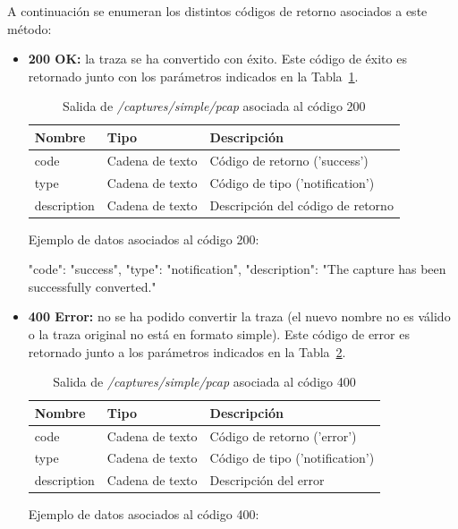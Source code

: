 A continuación se enumeran los distintos códigos de retorno asociados a este método:
\begin{itemize}

\item{\textbf{200 OK:} la \gls{traza} se ha convertido con éxito.
Este código de éxito es retornado junto con los parámetros indicados en la Tabla~\ref{extra:api:capturessimplepcap:ok}.
\begin{table}[H]
\centering
\begin{tabular}{|l|l|l|}
\hline
\rowcolor[HTML]{F5F5F5}
\textbf{Nombre}  & \textbf{Tipo}   & \textbf{Descripción}              \\ \hline
code             & Cadena de texto & Código de retorno ('success')     \\ \hline
type             & Cadena de texto & Código de tipo ('notification')   \\ \hline
description      & Cadena de texto & Descripción del código de retorno \\ \hline
\end{tabular}
\caption{Salida de \textit{/captures/simple/pcap} asociada al código 200}
\label{extra:api:capturessimplepcap:ok}
\end{table}
\begin{minipage}{\textwidth}
Ejemplo de datos asociados al código 200:

\begin{code}[language=json]
{
  "code": "success",
  "type": "notification",
  "description": "The capture has been successfully converted."
}
\end{code}
\end{minipage}
}

\item{\textbf{400 Error:} no se ha podido convertir la \gls{traza} (el nuevo nombre no es válido o la \gls{traza} original no está en formato \gls{simple}).
Este código de error es retornado junto a los parámetros indicados en la Tabla~\ref{extra:api:capturessimplepcap:error}.
\begin{table}[H]
\centering
\begin{tabular}{|l|l|l|}
\hline
\rowcolor[HTML]{F5F5F5}
\textbf{Nombre}  & \textbf{Tipo}   & \textbf{Descripción}            \\ \hline
code             & Cadena de texto & Código de retorno ('error')     \\ \hline
type             & Cadena de texto & Código de tipo ('notification') \\ \hline
description      & Cadena de texto & Descripción del error           \\ \hline
\end{tabular}
\caption{Salida de \textit{/captures/simple/pcap} asociada al código 400}
\label{extra:api:capturessimplepcap:error}
\end{table}
\begin{minipage}{\textwidth}
Ejemplo de datos asociados al código 400:


\end{minipage}}
\end{itemize}
